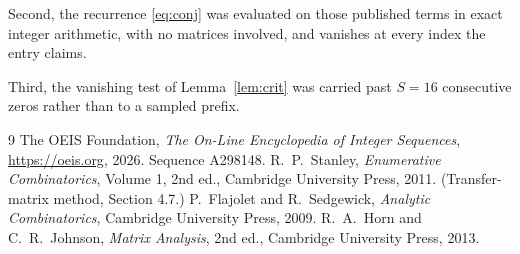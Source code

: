 \documentclass[11pt,a4paper]{article}
\theoremstyle{plain}
\theoremstyle{definition}
\begin{document}
Second, the recurrence \eqref{eq:conj} was evaluated on those published terms in exact
integer arithmetic, with no matrices involved, and vanishes at every index the entry claims.

Third, the vanishing test of Lemma~\ref{lem:crit} was carried past $S=16$ consecutive
zeros rather than to a sampled prefix.

\begin{thebibliography}{9}
 The OEIS Foundation, \emph{The On-Line Encyclopedia of Integer
Sequences}, \url{https://oeis.org}, 2026. Sequence A298148.
 R.~P.~Stanley, \emph{Enumerative Combinatorics}, Volume 1, 2nd ed.,
Cambridge University Press, 2011. (Transfer-matrix method, Section 4.7.)
 P.~Flajolet and R.~Sedgewick, \emph{Analytic Combinatorics}, Cambridge
University Press, 2009.
 R.~A.~Horn and C.~R.~Johnson, \emph{Matrix Analysis}, 2nd ed., Cambridge
University Press, 2013.
\end{thebibliography}
\end{document}
